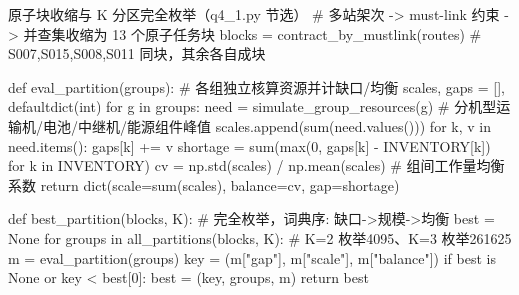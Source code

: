 \begin{Python}{原子块收缩与 K 分区完全枚举（q4\_1.py 节选）}
# 多站架次 -> must-link 约束 -> 并查集收缩为 13 个原子任务块
blocks = contract_by_mustlink(routes)        # {S007,S015},{S008,S011} 同块，其余各自成块

def eval_partition(groups):                  # 各组独立核算资源并计缺口/均衡
    scales, gaps = [], defaultdict(int)
    for g in groups:
        need = simulate_group_resources(g)   # 分机型运输机/电池/中继机/能源组件峰值
        scales.append(sum(need.values()))
        for k, v in need.items(): gaps[k] += v
    shortage = sum(max(0, gaps[k] - INVENTORY[k]) for k in INVENTORY)
    cv = np.std(scales) / np.mean(scales)    # 组间工作量均衡系数
    return dict(scale=sum(scales), balance=cv, gap=shortage)

def best_partition(blocks, K):               # 完全枚举，词典序: 缺口->规模->均衡
    best = None
    for groups in all_partitions(blocks, K): # K=2 枚举4095、K=3 枚举261625
        m = eval_partition(groups)
        key = (m["gap"], m["scale"], m["balance"])
        if best is None or key < best[0]: best = (key, groups, m)
    return best
\end{Python}
